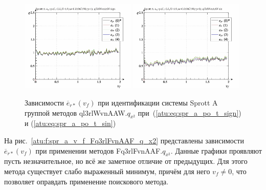 \begin{figure}[htb!]
  \centerline{
    \includegraphics[width=0.49\textwidth]{p/cha/spr_a/ql3rlWvnAAW_x2/sprott_a_id-p_v_f_sign.png}
    \hfill
    \includegraphics[width=0.49\textwidth]{p/cha/spr_a/ql3rlWvnAAW_x2/sprott_a_id-p_v_f_sin.png}
  }
  \caption{Зависимости $\overline{e}_{r*}(v_f)$ при идентификации системы Sprott A группой методов ql3rlWvnAAW.$q_{x^2}$
   при~(\ref{atu:eq:spr_a_po_t_sign}) и (\ref{atu:eq:spr_a_po_t_sin})}
  \label{atu:f:spr_a_v_f_ql3rlWvnAAW_q_x2}
\end{figure}

На рис.~\ref{atu:f:spr_a_v_f_Fq3rlFvnAAF_q_x2} представлены зависимости
$\overline{e}_{r*}(v_f)$ при применении методов Fq3rlFvnAAF.$q_{x^2}$.
Данные графики проявляют пусть незначительное,
но всё же заметное отличие от предыдущих.
Для этого метода существует слабо выраженный минимум,
причём для него $v_f \ne 0 $, что позволяет
оправдать применение поискового метода.

